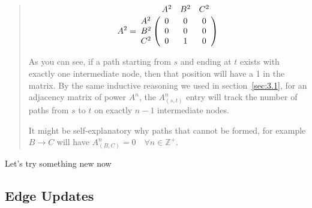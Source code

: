 \documentclass[12pt]{article}
\begin{document}
\begin{quote}
    \[
        A^2 =
        \bordermatrix{
            & A^2 & B^2 & C^2 \cr
            A^2 & 0 & 0 & 0 \cr
            B^2 & 0 & 0 & 0 \cr
            C^2 & 0 & 1 & 0 \cr
        }
    \]

    As you can see, if a path starting from $s$ and ending at $t$ exists with exactly one intermediate node, then that position will have a 1 in the matrix. By the same inductive reasoning we used in section~\ref{sec:3.1}, for an adjacency matrix of power $A^n$, the $A^n_{(s, t)}$ entry will track the number of paths from $s$ to $t$ on exactly $n - 1$ intermediate nodes.




    It might be self-explanatory why paths that cannot be formed, for example $B \to C$ will have $A^n_{(B, C)} = 0 \quad \forall n \in \mathds{Z}^+$.
\end{quote}

Let's try something new now

\subsection{Edge Updates}
\end{document}
